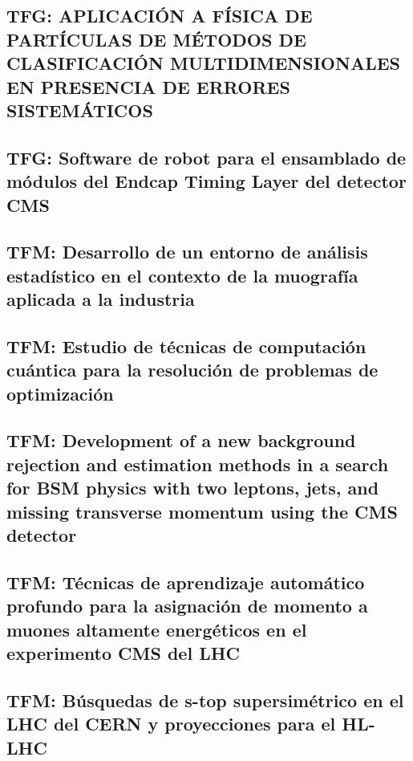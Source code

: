 \documentclass[a4paper, 11pt, twoside, openright]{report}
\begin{document}
\subsection{TFG: APLICACIÓN A FÍSICA DE PARTÍCULAS DE MÉTODOS DE CLASIFICACIÓN MULTIDIMENSIONALES EN PRESENCIA DE ERRORES SISTEMÁTICOS}


\subsection{TFG: Software de robot para el ensamblado de módulos del Endcap Timing Layer del detector CMS}


\subsection{TFM: Desarrollo de un entorno de análisis estadístico en el contexto de la muografía aplicada a la industria}


\subsection{TFM: Estudio de técnicas de computación cuántica para la resolución de problemas de optimización}


\subsection{TFM: Development of a new background rejection and estimation methods in a search for BSM physics with two leptons, jets, and missing transverse momentum using the CMS detector}


\subsection{TFM: Técnicas de aprendizaje automático profundo para la asignación de momento a muones altamente energéticos en el experimento CMS del LHC}


\subsection{TFM: Búsquedas de s-top supersimétrico en el LHC del CERN y proyecciones para el HL-LHC}

\end{document}
